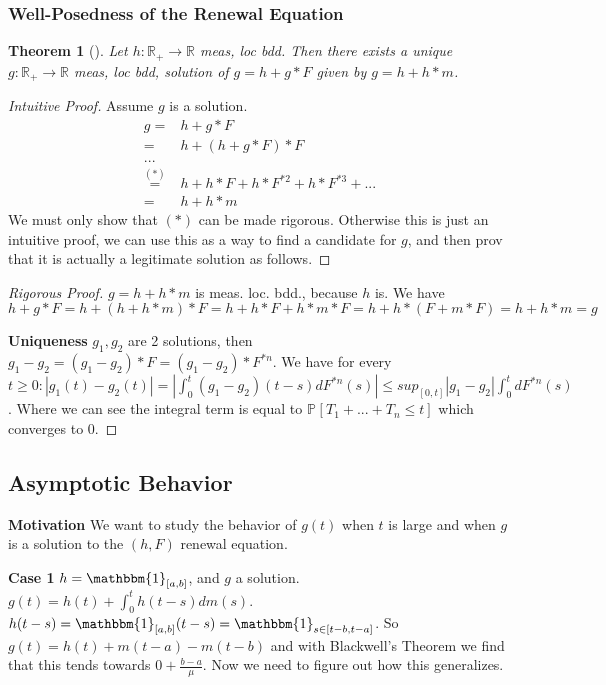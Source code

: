 \documentclass[12pt]{book}
\newtheorem{theorem}{Theorem}[section]
\theoremstyle{definition}
\theoremstyle{remark}
\begin{document}
\subsubsection{Well-Posedness of the Renewal Equation}
\begin{theorem}[]
	Let $h: \mathbb{R}_+\to \mathbb{R}$ meas, loc bdd. Then there exists a unique $g: \mathbb{R}_+ \to \mathbb{R}$ meas, loc bdd, solution of $g = h + g*F$ given by $g=h+h*m$. 
\end{theorem}
\begin{proof}[Intuitive Proof]
	Assume $g$ is a solution. 
\begin{align*}
	g =& h + g*F \\
	=& h + (h+g*F)*F \\
	... \\
	\stackrel{(*)}{=}& h + h*F + h*F^{*2} + h*F^{*3}+... \\
	=& h + h*m
\end{align*}
We must only show that $(*)$ can be made rigorous. Otherwise this is just an intuitive proof, we can use this as a way to find a candidate for $g$, and then prov that it is actually a legitimate solution as follows.
\end{proof}
\begin{proof}[Rigorous Proof]
	$g = h + h*m$ is meas. loc. bdd., because  $h$ is. We have $h + g*F = h + (h+h*m)*F = h + h*F + h*m*F=h+h*(F+m*F)=h+h*m = g$	

\textbf{Uniqueness} 
$g_1, g_2$ are 2 solutions, then $g_1-g_2 = (g_1 - g_2)*F = (g_1 - g_2) * F^{*n}$. We have for every $t \geq 0: |g_1(t) - g_2(t)| = \left| \int_{0}^{t} (g_1 - g_2)(t-s)dF^{*n}(s) \right| \leq sup_{[0,t]} |g_1 - g_2| \int_{0}^{t} dF^{*n}(s)$. Where we can see the integral term is equal to $\mathbb{P}_{} \left[ T_1 +... +T_n \leq t \right] $ which converges to 0.
\end{proof}

\subsection{Asymptotic Behavior}

\textbf{Motivation} We want to study the behavior of $g(t)$ when  $t$ is large and when $g$ is a solution to the $(h,F)$ renewal equation.

\textbf{Case 1} $h=\mathbbm{1}_{[a,b]} $, and $g$ a solution. $g(t) = h(t) + \int_{0}^{t} h(t-s)dm(s)$. $h(t-s) = \mathbbm{1}_{[a,b]}(t-s) = \mathbbm{1}_{s \in [t-b, t-a]}$. So $g(t) = h(t) + m(t-a)-m(t-b)$ and with Blackwell's Theorem we find that this tends towards $0+\frac{b-a}{\mu}$. Now we need to figure out how this generalizes.
\end{document}
